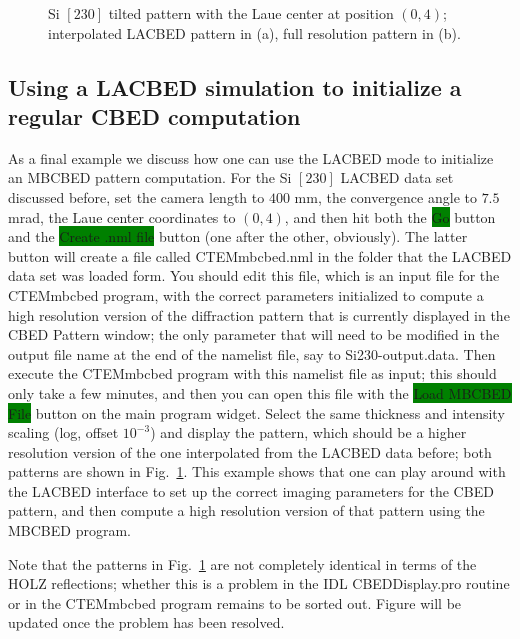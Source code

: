 \documentclass[DIV=calc, paper=letter, fontsize=11pt]{scrartcl}	 %
\newcommand{\button}[1]{\colorbox{green}{\textsf{#1}} button}
\begin{document}
\begin{figure}[h]
\leavevmode\centering
{}
\caption{\label{fig:ex5}Si $[230]$ tilted pattern with the Laue center at position $(0,4)$; interpolated LACBED pattern in (a), full 
resolution pattern in (b).}
\end{figure}

\subsection{Using a LACBED simulation to initialize a regular CBED computation\label{sec:example3}}
As a final example we discuss how one can use the \textsf{LACBED} mode to initialize an MBCBED pattern computation.
For the Si $[230]$ LACBED data set discussed before, set the camera length to $400$ mm, the convergence angle to $7.5$ mrad,
the Laue center coordinates to $(0,4)$, and then hit both the \button{Go} and the \button{Create .nml file} (one after the other, obviously).
The latter button will create a file called \textsf{CTEMmbcbed.nml} in the folder that the \textsf{LACBED} data set was loaded form.
You should edit this file, which is an input file for the \textsf{CTEMmbcbed} program, with the correct parameters initialized to compute 
a high resolution version of the diffraction pattern that is currently displayed in the CBED Pattern window; the only parameter that 
will need to be modified in the output file name at the end of the namelist file, say to \textsf{Si230-output.data}.  Then execute the \textsf{CTEMmbcbed} program with 
this namelist file as input; this should only take a few minutes, and then you can open this file with the \button{Load MBCBED File} on the main
program widget.  Select the same thickness and intensity scaling (log, offset $10^{-3}$) and display the pattern, which should be a higher
resolution version of the one interpolated from the LACBED data before; both patterns are shown in Fig.~\ref{fig:ex5}.
This example shows that one can play around with the LACBED interface to set up the correct imaging parameters for the CBED pattern,
and then compute a high resolution version of that pattern using the MBCBED program.

{\color{blue}Note that the patterns in Fig.~\ref{fig:ex5} are not completely identical in terms of the HOLZ reflections; whether this 
is a problem in the IDL CBEDDisplay.pro routine or in the CTEMmbcbed program remains to be sorted out.  Figure will be updated
once the problem has been resolved.  }
\end{document}
